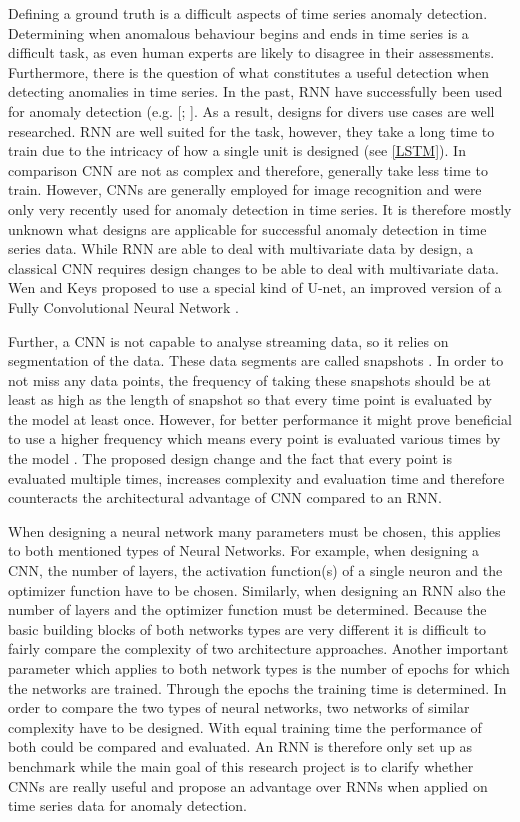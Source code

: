 Defining a ground truth is a difficult aspects of time series anomaly detection. Determining when anomalous behaviour begins and ends in time series is a difficult task, as even human experts are likely to disagree in their assessments. Furthermore, there is the question of what constitutes a useful detection when detecting anomalies in time series.
In the past, RNN have successfully been used for anomaly detection (e.g. [\parencite{Malhotra2015}; \parencite{Fan2016}]. As a result, designs for divers use cases are well researched. RNN are well suited for the task, however, they take a long time to train due to the intricacy of how a single unit is designed (see \ref{LSTM}). In comparison CNN are not as complex and therefore, generally take less time to train. However, CNNs are generally employed for image recognition and were only very recently used for anomaly detection in time series. It is therefore mostly unknown what designs are applicable for successful anomaly detection in time series data. %
While RNN are able to deal with multivariate data by design, a classical CNN requires design changes to be able to deal with multivariate data. Wen and Keys \parencite*{Wen2019} proposed to use a special kind of U-net, an improved version of a Fully Convolutional Neural Network \parencite{Ronneberger2015}.

Further, a CNN is not capable to analyse streaming data, so it relies on segmentation of the data. These data segments are called snapshots \parencite{Wen2019}. In order to not miss any data points, the frequency of taking these snapshots should be at least as high as the length of snapshot so that every time point is evaluated by the model at least once. However, for better performance it might prove beneficial to use a higher frequency which means every point is evaluated various times by the model \parencite{Wen2019}. The proposed design change and the fact that every point is evaluated multiple times, increases complexity and evaluation time and therefore counteracts the architectural advantage of CNN compared to an RNN. 

When designing a neural network many parameters must be chosen, this applies to both mentioned types of Neural Networks. For example, when designing a CNN, the number of layers, the activation function(s) of a single neuron and the optimizer function have to be chosen. Similarly, when designing an RNN also the number of layers and the optimizer function must be determined. Because the basic building blocks of both networks types are very different it is difficult to fairly compare the complexity of two architecture approaches. Another important parameter which applies to both network types is the number of epochs for which the networks are trained. Through the epochs the training time is determined. In order to compare the two types of neural networks, two networks of similar complexity have to be designed. With equal training time the performance of both could be compared and evaluated. An RNN is therefore only set up as benchmark while the main goal of this research project is to clarify whether CNNs are really useful and propose an advantage over RNNs when applied on time series data for anomaly detection.


